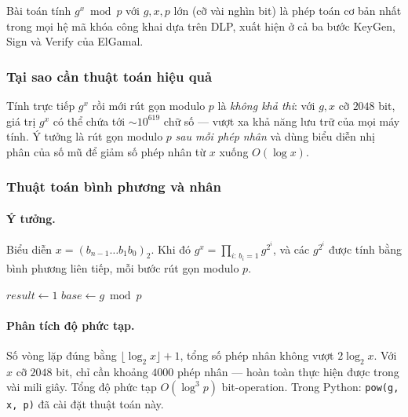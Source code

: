 \documentclass[../DoAn.tex]{subfiles}
\begin{document}
Bài toán tính $g^x \bmod p$ với $g, x, p$ lớn (cỡ vài nghìn bit) là phép toán cơ bản nhất trong mọi hệ mã khóa công khai dựa trên DLP, xuất hiện ở cả ba bước KeyGen, Sign và Verify của ElGamal.

\subsubsection{Tại sao cần thuật toán hiệu quả}

Tính trực tiếp $g^x$ rồi mới rút gọn modulo $p$ là \emph{không khả thi}: với $g, x$ cỡ $2048$ bit, giá trị $g^x$ có thể chứa tới $\sim 10^{619}$ chữ số --- vượt xa khả năng lưu trữ của mọi máy tính. Ý tưởng là rút gọn modulo $p$ \emph{sau mỗi phép nhân} và dùng biểu diễn nhị phân của số mũ để giảm số phép nhân từ $x$ xuống $O(\log x)$.

\subsubsection{Thuật toán bình phương và nhân}

\paragraph{Ý tưởng.}
Biểu diễn $x = (b_{n-1} \ldots b_1 b_0)_2$. Khi đó $g^x = \prod_{i:\, b_i = 1} g^{2^i}$, và các $g^{2^i}$ được tính bằng bình phương liên tiếp, mỗi bước rút gọn modulo $p$.

\begin{algorithm}[H]
\caption{Lũy thừa modular --- bình phương và nhân}
\label{alg:modexp}
$\mathit{result} \gets 1$\;
$\mathit{base} \gets g \bmod p$\;
\;
\end{algorithm}

\paragraph{Phân tích độ phức tạp.}
Số vòng lặp đúng bằng $\lfloor \log_2 x \rfloor + 1$, tổng số phép nhân không vượt $2\log_2 x$. Với $x$ cỡ $2048$ bit, chỉ cần khoảng $4000$ phép nhân --- hoàn toàn thực hiện được trong vài mili giây. Tổng độ phức tạp $O(\log^3 p)$ bit-operation. Trong Python: \texttt{pow(g, x, p)} đã cài đặt thuật toán này.
\end{document}
